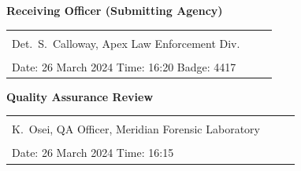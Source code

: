 \documentclass[letterpaper,11pt]{article}
\begin{document}
\begin{tcolorbox}[sectionbox, title={\faUserShield\quad AUTHORISING SIGNATURES}]
\noindent
\begin{minipage}[t]{0.48\linewidth}
  \textbf{Receiving Officer (Submitting Agency)}\\[5pt]
  \begin{tabular}{@{}p{0.90\linewidth}@{}}
    \arrayrulecolor{ForensicBlue}\hline\\[-4pt]
    Det.\ S.\ Calloway, Apex Law Enforcement Div.\\[7pt]
    \hline\\[-4pt]
    Date: 26 March 2024 \quad Time: 16:20 \quad Badge: 4417\\
  \end{tabular}
\end{minipage}%
\hfill
\begin{minipage}[t]{0.48\linewidth}
  \textbf{Quality Assurance Review}\\[5pt]
  \begin{tabular}{@{}p{0.90\linewidth}@{}}
    \arrayrulecolor{ForensicBlue}\hline\\[-4pt]
    K.\ Osei, QA Officer, Meridian Forensic Laboratory\\[7pt]
    \hline\\[-4pt]
    Date: 26 March 2024 \quad Time: 16:15\\
  \end{tabular}
\end{minipage}
\vspace{2pt}
\end{tcolorbox}

\vspace{4pt}
\begin{center}
\end{center}

\label{LastPage}
\end{document}
